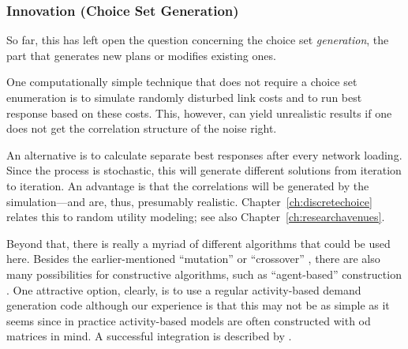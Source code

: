 \subsubsection{Innovation (Choice Set Generation)}
\label{sec:innovation}

So far, this has left open the question concerning the choice set
\emph{generation}, \ie the part that generates new plans or modifies
existing ones.  

One computationally simple technique that does not require a choice
set enumeration is to simulate randomly disturbed link costs and to
run best response based on these costs. This, however, can yield
unrealistic results if one does not get the correlation structure of
the noise right.

An alternative is to calculate separate best responses after every
network loading.  Since the process is stochastic, this will generate
different solutions from iteration to iteration.  An advantage is that
the correlations will be generated by the simulation---and are, thus,
presumably realistic. Chapter~\ref{ch:discretechoice}
relates this to random utility modeling; see also Chapter~\ref{ch:researchavenues}.

Beyond that, there is really a myriad of different algorithms that
could be used here.  Besides the earlier-mentioned ``mutation''
\citep{BalmerRaneyEtAl2005act-times} or ``crossover''
\citep{CharyparNagel2005ga4acts,MeisterBalmerEtc2006planomatIatbr},
there are also many possibilities for constructive algorithms, such as
``agent-based'' construction
\citep{ZhuLevinsonZhang2008AgentBasedRouteChoice2}.  One attractive
option, clearly, is to use a regular activity-based demand generation
code \citep[e.g.,][]{BowmanEtc1999PortlandActs,MillerRoordaTASHA}
although our experience is that this may not be as simple as it seems
\citep{RieserNagelEtc2007early-berlin-trr} since in practice
activity-based models are often constructed with \gls{od} matrices in mind.  
A successful integration is described by 
\cite{ZiemkeNagelBhatIntegratingCemdapMatsimTransferability}.



